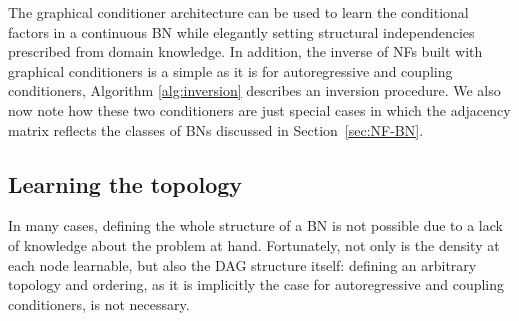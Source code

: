 The graphical conditioner architecture can be used to learn the conditional factors in a continuous BN while elegantly setting structural independencies prescribed from domain knowledge. In addition, the inverse of NFs built with graphical conditioners is a simple as it is for autoregressive and coupling conditioners, Algorithm \ref{alg:inversion} describes an inversion procedure.
We also now note how these two conditioners are just special cases in which the adjacency matrix reflects the classes of BNs discussed in Section~\ref{sec:NF-BN}.

\subsection{Learning the topology}\label{sec:learn_topo}
In many cases, defining the whole structure of a BN is not possible due to a lack of knowledge about the problem at hand.
Fortunately, not only is the density at each node learnable, but also the DAG structure itself:
defining an arbitrary topology and ordering, as it is implicitly the case for autoregressive and coupling conditioners, is not necessary.


